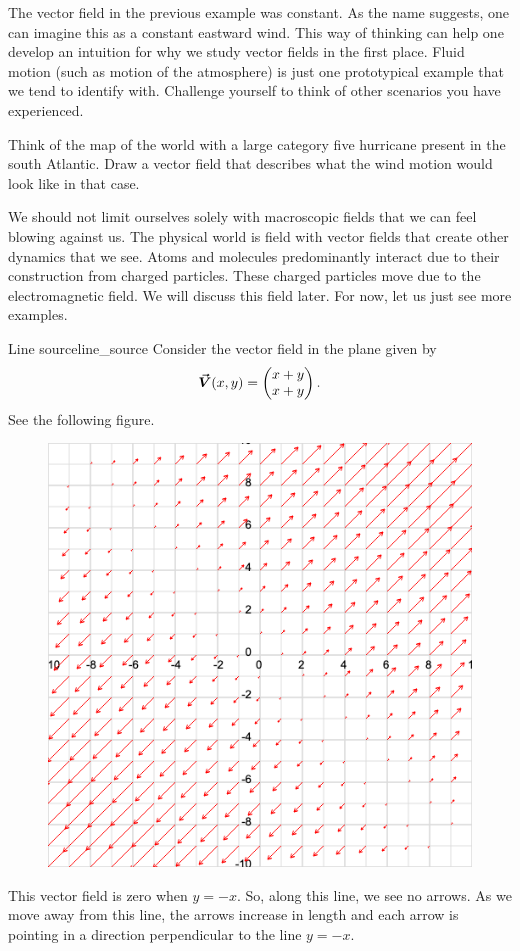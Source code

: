                 The vector field in the previous example was constant. As the name suggests, one can imagine this as a constant eastward wind. This way of thinking can help one develop an intuition for why we study vector fields in the first place. Fluid motion (such as motion of the atmosphere) is just one prototypical example that we tend to identify with. Challenge yourself to think of other scenarios you have experienced.

                \begin{exercise}
                    Think of the map of the world with a large category five hurricane present in the south Atlantic. Draw a vector field that describes what the wind motion would look like in that case. 
                \end{exercise}

We should not limit ourselves solely with macroscopic fields that we can feel blowing against us. The physical world is field with vector fields that create other dynamics that we see. Atoms and molecules predominantly interact due to their construction from charged particles. These charged particles move due to the electromagnetic field. We will discuss this field later. For now, let us just see more examples.
                
                \begin{ex}{Line source}{line_source}
                Consider the vector field in the plane given by
                \[
                \boldsymbol{\vec{V}}(x,y)=\begin{pmatrix} x + y\\ x+y \end{pmatrix}.
                \]
                See the following figure.
                \begin{figure}[H]
                    \centering
                    \includegraphics[width=.6\textwidth]{Figures_Part_6/v_field_1.png}
                \end{figure}
                This vector field is zero when $y=-x$. So, along this line, we see no arrows. As we move away from this line, the arrows increase in length and each arrow is pointing in a direction perpendicular to the line $y=-x$. 
                \end{ex}
                
